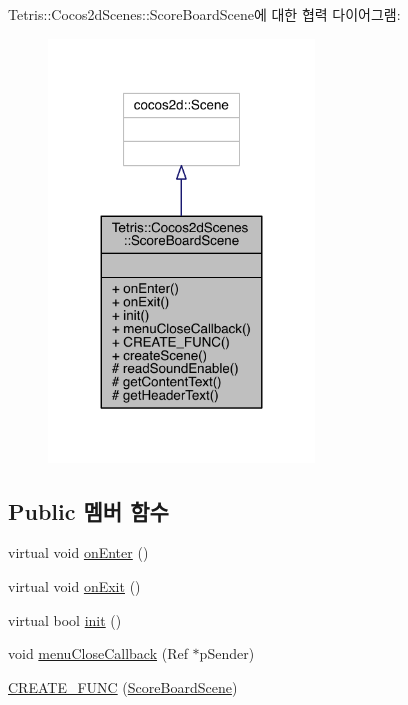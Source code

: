 Tetris\+:\+:Cocos2d\+Scenes\+:\+:Score\+Board\+Scene에 대한 협력 다이어그램\+:
\nopagebreak
\begin{figure}[H]
\begin{center}
\leavevmode
\includegraphics[width=200pt]{d3/dc2/class_tetris_1_1_cocos2d_scenes_1_1_score_board_scene__coll__graph}
\end{center}
\end{figure}
\subsection*{Public 멤버 함수}
\begin{DoxyCompactItemize}
\item 
virtual void \hyperlink{class_tetris_1_1_cocos2d_scenes_1_1_score_board_scene_a667d5d9ca7709281c7b67814e5495a26}{on\+Enter} ()
\item 
virtual void \hyperlink{class_tetris_1_1_cocos2d_scenes_1_1_score_board_scene_ade9d785bcda22a7d410c316909377ff8}{on\+Exit} ()
\item 
virtual bool \hyperlink{class_tetris_1_1_cocos2d_scenes_1_1_score_board_scene_a348c50d4213a4fee3888c216c16712ef}{init} ()
\item 
void \hyperlink{class_tetris_1_1_cocos2d_scenes_1_1_score_board_scene_ad17f53b26718969718fed03b2b38ff61}{menu\+Close\+Callback} (Ref $\ast$p\+Sender)
\item 
\hyperlink{class_tetris_1_1_cocos2d_scenes_1_1_score_board_scene_afe728259a0507c6fdec598ef5334a3a5}{C\+R\+E\+A\+T\+E\+\_\+\+F\+U\+NC} (\hyperlink{class_tetris_1_1_cocos2d_scenes_1_1_score_board_scene}{Score\+Board\+Scene})
\end{DoxyCompactItemize}
